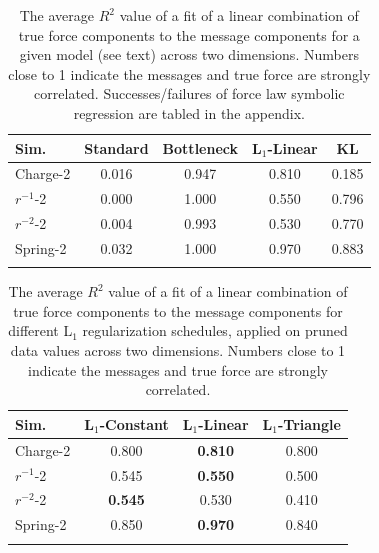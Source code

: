 \documentclass{article}
\begin{document}
 
\begin{table}[h]
    \centering
\begin{tabular}{@{}lcccc@{}}
    \toprule
        Sim. &         Standard &                Bottleneck &                   L$_1$-Linear       &                   KL      \\ \midrule
    Charge-2 &           0.016  &                   0.947   &                   0.810       &                 0.185     \\                                      
    $r^{-1}$-2 &         0.000  &                   1.000   &                   0.550       &                 0.796     \\                                
    $r^{-2}$-2 &         0.004  &                   0.993   &                   0.530       &                 0.770     \\                                
    Spring-2 &           0.032  &                   1.000   &                   0.970       &                 0.883     \\ \bottomrule\\
\end{tabular}
\caption{The average $R^2$ value of a fit of
    a linear combination of true force components to the message components
    for a given model (see text) across two dimensions.
    Numbers close to 1 indicate the messages and true force are strongly correlated.
    Successes/failures of force law symbolic regression are tabled in the appendix.
    }
\label{tbl:forcefit}
\end{table}

\begin{table}[h]
    \centering
\begin{tabular}{@{}lccc@{}}
    \toprule
        Sim. & L$_1$-Constant & L$_1$-Linear & L$_1$-Triangle \\ \midrule
    Charge-2 & 0.800 & \textbf{0.810} & 0.800 \\                                      
    $r^{-1}$-2 & 0.545 & \textbf{0.550} & 0.500 \\                                
    $r^{-2}$-2 & \textbf{0.545} & 0.530 & 0.410 \\                                
    Spring-2 & 0.850 & \textbf{0.970} & 0.840 \\ \bottomrule\\
\end{tabular}
\caption{The average $R^2$ value of a fit of
    a linear combination of true force components to the message components
    for different L$_1$ regularization schedules, applied on pruned data values across two dimensions.
    Numbers close to 1 indicate the messages and true force are strongly correlated.
    }
\label{tbl:l1_schedules}
\end{table}
\end{document}
